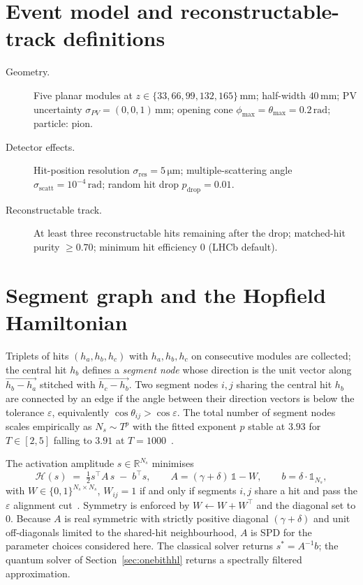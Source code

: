 \documentclass[11pt,a4paper]{article}
\begin{document}
\section{Event model and reconstructable-track definitions}
\label{sec:event}
\begin{description}
\item[Geometry.] Five planar modules at $z \in \{33, 66, 99, 132, 165\}\,\mathrm{mm}$;
half-width $40\,\mathrm{mm}$; PV uncertainty $\sigma_{PV} = (0,0,1)\,\mathrm{mm}$; opening
cone $\phi_{\max} = \theta_{\max} = 0.2\,\mathrm{rad}$; particle: pion.
\item[Detector effects.] Hit-position resolution $\sigma_{\mathrm{res}} = 5\,\mathrm{\mu m}$;
multiple-scattering angle $\sigma_{\mathrm{scatt}} = 10^{-4}\,\mathrm{rad}$; random hit drop
$p_{\mathrm{drop}} = 0.01$.
\item[Reconstructable track.] At least three reconstructable hits remaining after the
drop; matched-hit purity $\ge 0.70$; minimum hit efficiency $0$ (LHCb default).
\end{description}

\section{Segment graph and the Hopfield Hamiltonian}
\label{sec:ham}
Triplets of hits $(h_a, h_b, h_c)$ with $h_a, h_b, h_c$ on consecutive modules are
collected; the central hit $h_b$ defines a \emph{segment node} whose direction is the unit
vector along $\vec{h_b - h_a}$ stitched with $\vec{h_c - h_b}$. Two segment nodes $i, j$
sharing the central hit $h_b$ are connected by an edge if the angle between their
direction vectors is below the tolerance $\varepsilon$, equivalently $\cos\theta_{ij} >
\cos\varepsilon$. The total number of segment nodes scales empirically as $N_s \sim T^p$
with the fitted exponent $p$ stable at $3.93$ for $T \in [2,5]$ falling to $3.91$ at
$T = 1000$~\cite{velo_toy}.

The activation amplitude $s \in \mathbb R^{N_s}$ minimises
\begin{equation}
\label{eq:cost}
\mathcal H(s) \;=\; \tfrac{1}{2} s^{\top} A\, s \;-\; b^{\top} s, \qquad
A = (\gamma + \delta)\, \mathbb 1 - W, \qquad
b = \delta \cdot \mathbb 1_{N_s},
\end{equation}
with $W \in \{0,1\}^{N_s \times N_s}$, $W_{ij} = 1$ if and only if segments $i,j$ share a
hit and pass the $\varepsilon$ alignment cut~\cite{stimpfl_garrido}. Symmetry is enforced by
$W \leftarrow W + W^{\top}$ and the diagonal set to $0$. Because $A$ is real symmetric
with strictly positive diagonal $(\gamma+\delta)$ and unit off-diagonals limited to the
shared-hit neighbourhood, $A$ is SPD for the parameter choices considered here. The
classical solver returns $s^* = A^{-1} b$; the quantum solver of
Section~\ref{sec:onebithhl} returns a spectrally filtered approximation.
\end{document}
